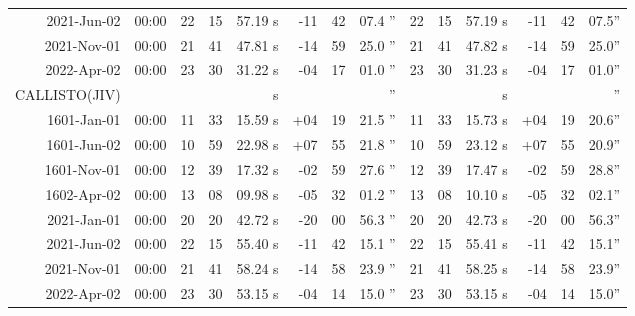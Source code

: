 \begin{longtable}{r@{\,}r|r@{h}r@{m}r<{s}|r@{°}r@{'}r<{''}||r@{h}r@{m}r<{s}|r@{°}r@{'}r<{''}}
 2021-Jun-02 & 00:00  &   22 & 15 & 57.19 & -11 & 42 & 07.4 & 22&15&57.19 & -11&42&07.5\\ %
 2021-Nov-01 & 00:00  &   21 & 41 & 47.81 & -14 & 59 & 25.0 & 21&41&47.82 & -14&59&25.0\\ %
 2022-Apr-02 & 00:00  &   23 & 30 & 31.22 & -04 & 17 & 01.0 & 23&30&31.23 & -04&17&01.0\\ %
CALLISTO(JIV) \\                                                                          
 1601-Jan-01 & 00:00  &   11 & 33 & 15.59 & +04 & 19 & 21.5 & 11&33&15.73 & +04&19&20.6\\ %
 1601-Jun-02 & 00:00  &   10 & 59 & 22.98 & +07 & 55 & 21.8 & 10&59&23.12 & +07&55&20.9\\ %
 1601-Nov-01 & 00:00  &   12 & 39 & 17.32 & -02 & 59 & 27.6 & 12&39&17.47 & -02&59&28.8\\ %
 1602-Apr-02 & 00:00  &   13 & 08 & 09.98 & -05 & 32 & 01.2 & 13&08&10.10 & -05&32&02.1\\ %
 2021-Jan-01 & 00:00  &   20 & 20 & 42.72 & -20 & 00 & 56.3 & 20&20&42.73 & -20&00&56.3\\ %
 2021-Jun-02 & 00:00  &   22 & 15 & 55.40 & -11 & 42 & 15.1 & 22&15&55.41 & -11&42&15.1\\ %
 2021-Nov-01 & 00:00  &   21 & 41 & 58.24 & -14 & 58 & 23.9 & 21&41&58.25 & -14&58&23.9\\ %
 2022-Apr-02 & 00:00  &   23 & 30 & 53.15 & -04 & 14 & 15.0 & 23&30&53.15 & -04&14&15.0\\ %

\end{longtable}
